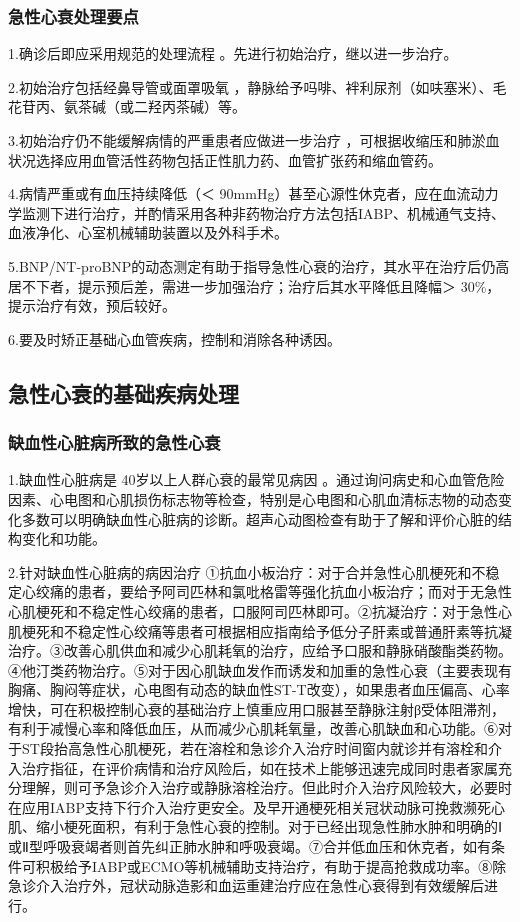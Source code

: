 \subsubsection{急性心衰处理要点}

1.确诊后即应采用规范的处理流程 。先进行初始治疗，继以进一步治疗。

2.初始治疗包括经鼻导管或面罩吸氧
，静脉给予吗啡、袢利尿剂（如呋塞米）、毛花苷丙、氨茶碱（或二羟丙茶碱）等。

3.初始治疗仍不能缓解病情的严重患者应做进一步治疗
，可根据收缩压和肺淤血状况选择应用血管活性药物包括正性肌力药、血管扩张药和缩血管药。

4.病情严重或有血压持续降低（＜
90mmHg）甚至心源性休克者，应在血流动力学监测下进行治疗，并酌情采用各种非药物治疗方法包括IABP、机械通气支持、血液净化、心室机械辅助装置以及外科手术。

5.BNP/NT-proBNP的动态测定有助于指导急性心衰的治疗，其水平在治疗后仍高居不下者，提示预后差，需进一步加强治疗；治疗后其水平降低且降幅＞
30\%，提示治疗有效，预后较好。

6.要及时矫正基础心血管疾病，控制和消除各种诱因。

\subsection{急性心衰的基础疾病处理}

\subsubsection{缺血性心脏病所致的急性心衰}

1.缺血性心脏病是 40岁以上人群心衰的最常见病因
。通过询问病史和心血管危险因素、心电图和心肌损伤标志物等检查，特别是心电图和心肌血清标志物的动态变化多数可以明确缺血性心脏病的诊断。超声心动图检查有助于了解和评价心脏的结构变化和功能。

2.针对缺血性心脏病的病因治疗
①抗血小板治疗：对于合并急性心肌梗死和不稳定心绞痛的患者，要给予阿司匹林和氯吡格雷等强化抗血小板治疗；而对于无急性心肌梗死和不稳定性心绞痛的患者，口服阿司匹林即可。②抗凝治疗：对于急性心肌梗死和不稳定性心绞痛等患者可根据相应指南给予低分子肝素或普通肝素等抗凝治疗。③改善心肌供血和减少心肌耗氧的治疗，应给予口服和静脉硝酸酯类药物。④他汀类药物治疗。⑤对于因心肌缺血发作而诱发和加重的急性心衰（主要表现有胸痛、胸闷等症状，心电图有动态的缺血性ST-T改变），如果患者血压偏高、心率增快，可在积极控制心衰的基础治疗上慎重应用口服甚至静脉注射β受体阻滞剂，有利于减慢心率和降低血压，从而减少心肌耗氧量，改善心肌缺血和心功能。⑥对于ST段抬高急性心肌梗死，若在溶栓和急诊介入治疗时间窗内就诊并有溶栓和介入治疗指征，在评价病情和治疗风险后，如在技术上能够迅速完成同时患者家属充分理解，则可予急诊介入治疗或静脉溶栓治疗。但此时介入治疗风险较大，必要时在应用IABP支持下行介入治疗更安全。及早开通梗死相关冠状动脉可挽救濒死心肌、缩小梗死面积，有利于急性心衰的控制。对于已经出现急性肺水肿和明确的Ⅰ或Ⅱ型呼吸衰竭者则首先纠正肺水肿和呼吸衰竭。⑦合并低血压和休克者，如有条件可积极给予IABP或ECMO等机械辅助支持治疗，有助于提高抢救成功率。⑧除急诊介入治疗外，冠状动脉造影和血运重建治疗应在急性心衰得到有效缓解后进行。

